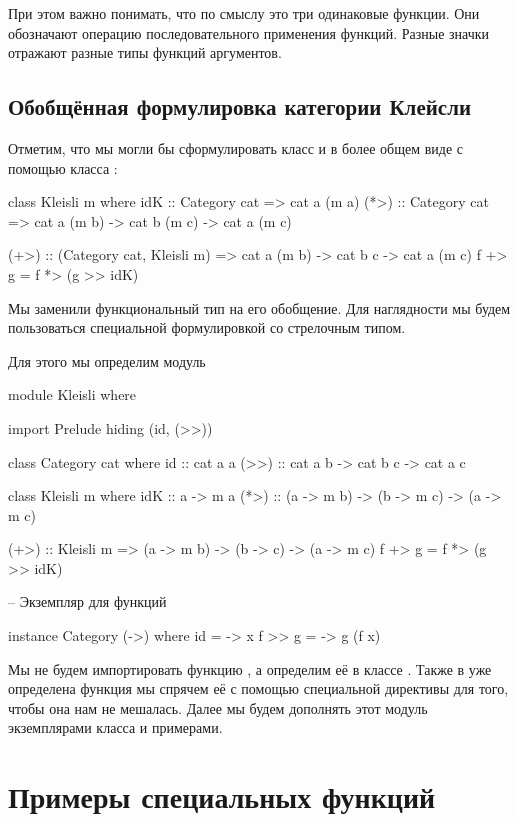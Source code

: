 При этом важно понимать, что по смыслу это три одинаковые функции. Они
обозначают операцию последовательного применения функций. Разные значки
отражают разные типы функций аргументов.

\subsection{Обобщённая формулировка категории Клейсли}

Отметим, что мы могли бы сформулировать класс  и в более
общем виде с помощью класса :


\begin{code}
class Kleisli m where
    idK  :: Category cat => cat a (m a)
    (*>) :: Category cat => cat a (m b) -> cat b (m c) -> cat a (m c)

(+>) :: (Category cat, Kleisli m) 
    => cat a (m b) -> cat b c -> cat a (m c)
f +> g = f *> (g >> idK)
\end{code}

Мы заменили функциональный тип на его обобщение. Для наглядности мы
будем пользоваться специальной формулировкой со стрелочным типом.

Для этого мы определим модуль 


\begin{code}
module Kleisli where

import Prelude hiding (id, (>>))

class Category cat where
    id   :: cat a a
    (>>) :: cat a b -> cat b c -> cat a c

class Kleisli m where
    idK  :: a -> m a
    (*>) :: (a -> m b) -> (b -> m c) -> (a -> m c)    

(+>) :: Kleisli m => (a -> m b) -> (b -> c) -> (a -> m c)
f +> g = f *> (g >> idK)

-- Экземпляр для функций

instance Category (->) where
    id      = \x -> x
    f >> g  = \x -> g (f x)
\end{code}

Мы не будем импортировать функцию , а определим её в классе
. Также в  уже определена функция \In{(>>)} мы
спрячем её с помощью специальной директивы  
для того, чтобы она нам не мешалась. Далее мы будем дополнять этот
модуль экземплярами класса  и примерами.

\section{Примеры специальных функций}

